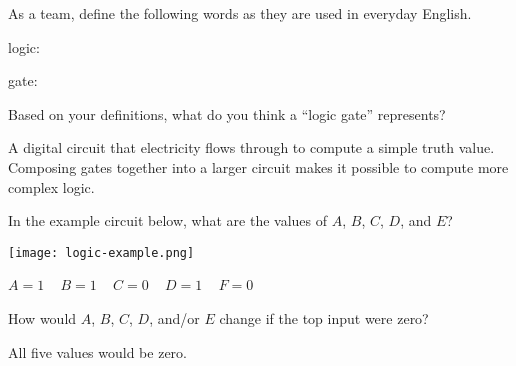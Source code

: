 \Q As a team, define the following words as they are used in everyday English.

\begin{description}
\item logic: 
\item gate: 
\end{description}


\Q Based on your definitions, what do you think a ``logic gate'' represents?

\begin{answer}
A digital circuit that electricity flows through to compute a simple truth value.
Composing gates together into a larger circuit makes it possible to compute more complex logic.
\end{answer}


\Q In the example circuit below, what are the values of $A$, $B$, $C$, $D$, and $E$?

\vspace{1em}
\begin{minipage}{0.45\textwidth}
\texttt{[image: logic-example.png]}
\end{minipage}
\hspace{1em}
\begin{minipage}{0.45\textwidth}
\begin{answer}
$A=1$ ~ $B=1$ ~ $C=0$ ~ $D=1$ ~ $F=0$
\end{answer}
\end{minipage}
\vspace{1em}


\Q How would $A$, $B$, $C$, $D$, and/or $E$ change if the top input were zero?

\begin{answer}[3em]
All five values would be zero.
\end{answer}
